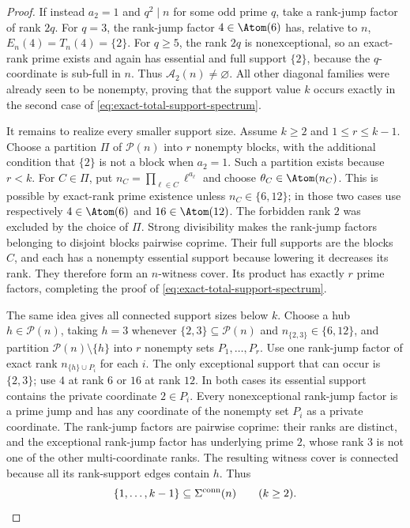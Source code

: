 \begin{proof}
If instead $a_2=1$ and $q^2\mid n$ for some odd prime $q$, take a rank-jump factor of
rank $2q$. For $q=3$, the rank-jump factor $4\in\Atom(6)$ has, relative to $n$,
$E_n(4)=T_n(4)=\{2\}$. For $q\ge5$, the rank $2q$ is nonexceptional, so an
exact-rank prime exists and again has essential and full support $\{2\}$,
because the $q$-coordinate is sub-full in $n$. Thus
$\mathcal A_2(n)\ne\varnothing$. All other diagonal families were already
seen to be nonempty, proving that the support value $k$ occurs exactly in the
second case of \eqref{eq:exact-total-support-spectrum}.

It remains to realize every smaller support size. Assume $k\ge2$ and
$1\le r\le k-1$. Choose a partition $\Pi$ of $\mathcal P(n)$ into $r$
nonempty blocks, with the additional condition that $\{2\}$ is not a block
when $a_2=1$. Such a partition exists because $r<k$. For $C\in\Pi$, put
$n_C=\prod_{\ell\in C}\ell^{a_\ell}$ and choose
$\theta_C\in\Atom(n_C)$. This is possible by exact-rank prime existence
unless $n_C\in\{6,12\}$; in those two cases use respectively
$4\in\Atom(6)$ and $16\in\Atom(12)$. The forbidden rank $2$ was excluded by
the choice of $\Pi$. Strong divisibility makes the rank-jump factors belonging to
disjoint blocks pairwise coprime. Their full supports are the blocks $C$, and
each has a nonempty essential support because lowering it decreases its rank.
They therefore form an $n$-witness cover. Its product has exactly $r$ prime
factors, completing the proof of \eqref{eq:exact-total-support-spectrum}.

The same idea gives all connected support sizes below $k$. Choose a hub
$h\in\mathcal P(n)$, taking $h=3$ whenever
$\{2,3\}\subseteq\mathcal P(n)$ and $n_{\{2,3\}}\in\{6,12\}$, and partition
$\mathcal P(n)\setminus\{h\}$ into $r$ nonempty sets $P_1,\ldots,P_r$.
Use one rank-jump factor of exact rank $n_{\{h\}\cup P_i}$ for each $i$. The only
exceptional support that can occur is $\{2,3\}$; use $4$ at rank $6$ or $16$
at rank $12$. In both cases its essential support contains the private
coordinate $2\in P_i$. Every nonexceptional rank-jump factor is a prime jump and has any
coordinate of the nonempty set $P_i$ as a private coordinate. The rank-jump factors are
pairwise coprime: their ranks are distinct, and the exceptional rank-jump factor has
underlying prime $2$, whose rank $3$ is not one of the other multi-coordinate
ranks. The resulting witness cover is connected because all its rank-support
edges contain $h$. Thus
\begin{equation}\label{eq:connected-spectrum-lower-interval}
 \{1,\ldots,k-1\}\subseteq\Sigma^{\rm conn}(n)\qquad(k\ge2).
\end{equation}


\end{proof}
